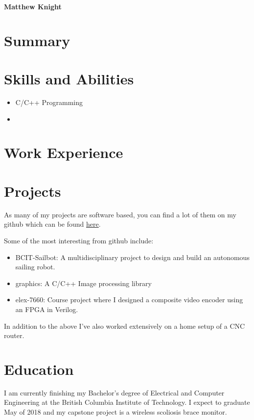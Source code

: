\documentclass{article}
\begin{document}
\begin{center}
    \LARGE\bfseries
    Matthew Knight
\end{center}

\section*{Summary}

\section*{Skills and Abilities}

\begin{itemize}
    
    \item C/C++ Programming

    \item 
\end{itemize}

\section*{Work Experience}

\begin{table}
        
\end{table}

\section*{Projects}

As many of my projects are software based, you can find a lot of them on my
github which can be found \href{https://github.com/matt1795}{here}.

Some of the most interesting from github include:

\begin{itemize}
    
    \item BCIT-Sailbot: A multidisciplinary project to design and build an
    autonomous sailing robot.

    \item graphics: A C/C++ Image processing library

    \item elex-7660: Course project where I designed a composite video encoder
    using an FPGA in Verilog.

\end{itemize}

In addition to the above I've also worked extensively on a home setup of a CNC
router.

\section*{Education}

I am currently finishing my Bachelor's degree of Electrical and Computer
Engineering at the British Columbia Institute of Technology. I expect to
graduate May of 2018 and my capstone project is a wireless scoliosis brace
monitor.
\end{document}
